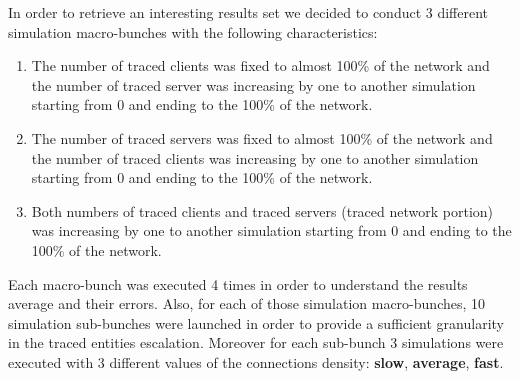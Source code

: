 In order to retrieve an interesting results set we decided to conduct
3 different simulation macro-bunches with the following characteristics:
\begin{enumerate}
	\item The number of traced clients was fixed to almost 100\% of the
network and the number of traced server was increasing by one to another
simulation starting from 0 and ending to the 100\% of the network.
	\item The number of traced servers was fixed to almost 100\% of the
network and the number of traced clients was increasing by one to another
simulation starting from 0 and ending to the 100\% of the network.
	\item Both numbers of traced clients and traced servers (traced
network portion) was increasing by one to another
simulation starting from 0 and ending to the 100\% of the network.
\end{enumerate}

Each macro-bunch was executed 4 times in order to understand the results
average and their errors. 
Also, for each of those simulation macro-bunches, 10 simulation sub-bunches were
launched in order to provide a sufficient granularity in the traced
entities escalation. Moreover for each sub-bunch 3 simulations were
executed with 3 different values of the connections density: \textbf{slow},
\textbf{average}, \textbf{fast}. 

